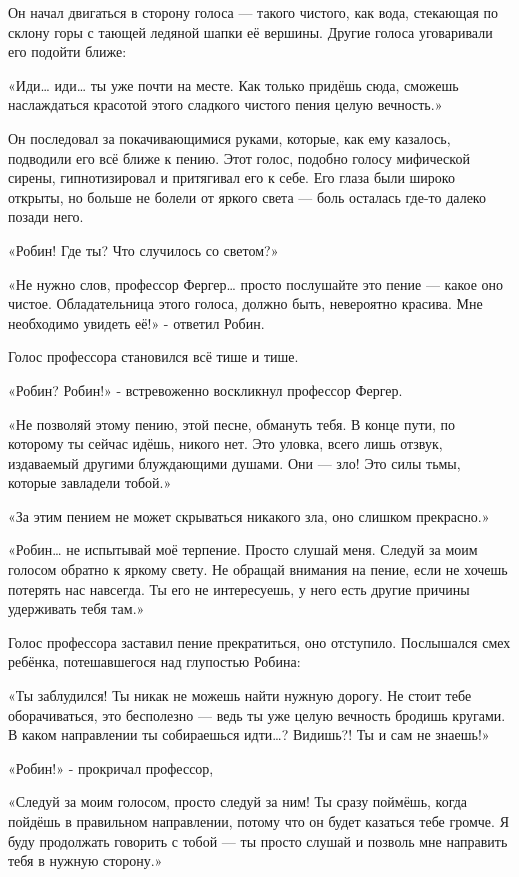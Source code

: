 \documentclass[a4paper,12pt]{book}
\begin{document}
\par
Он начал двигаться в сторону голоса — такого чистого, как вода, стекающая по склону горы с тающей ледяной шапки её вершины. Другие голоса уговаривали его подойти ближе:
\par
«Иди… иди… ты уже почти на месте. Как только придёшь сюда, сможешь наслаждаться красотой этого сладкого чистого пения целую вечность.»
\par
Он последовал за покачивающимися руками, которые, как ему казалось, подводили его всё ближе к пению. Этот голос, подобно голосу мифической сирены, гипнотизировал и притягивал его к себе. Его глаза были широко открыты, но больше не болели от яркого света — боль осталась где-то далеко позади него.
\par
«Робин! Где ты? Что случилось со светом?»
\par
«Не нужно слов, профессор Фергер… просто послушайте это пение — какое оно чистое. Обладательница этого голоса, должно быть, невероятно красива. Мне необходимо увидеть её!» - ответил Робин.
\par
Голос профессора становился всё тише и тише.
\par
«Робин? Робин!» - встревоженно воскликнул профессор Фергер.
\par
«Не позволяй этому пению, этой песне, обмануть тебя. В конце пути, по которому ты сейчас идёшь, никого нет. Это уловка, всего лишь отзвук, издаваемый другими блуждающими душами. Они — зло! Это силы тьмы, которые завладели тобой.»
\par
«За этим пением не может скрываться никакого зла, оно слишком прекрасно.»
\par
«Робин… не испытывай моё терпение. Просто слушай меня. Следуй за моим голосом обратно к яркому свету. Не обращай внимания на пение, если не хочешь потерять нас навсегда. Ты его не интересуешь, у него есть другие причины удерживать тебя там.»
\par
Голос профессора заставил пение прекратиться, оно отступило. Послышался смех ребёнка, потешавшегося над глупостью Робина:
\par
«Ты заблудился! Ты никак не можешь найти нужную дорогу. Не стоит тебе оборачиваться, это бесполезно — ведь ты уже целую вечность бродишь кругами. В каком направлении ты собираешься идти…? Видишь?! Ты и сам не знаешь!»
\par
«Робин!» - прокричал профессор,
\par
«Следуй за моим голосом, просто следуй за ним! Ты сразу поймёшь, когда пойдёшь в правильном направлении, потому что он будет казаться тебе громче. Я буду продолжать говорить с тобой — ты просто слушай и позволь мне направить тебя в нужную сторону.»
\end{document}
